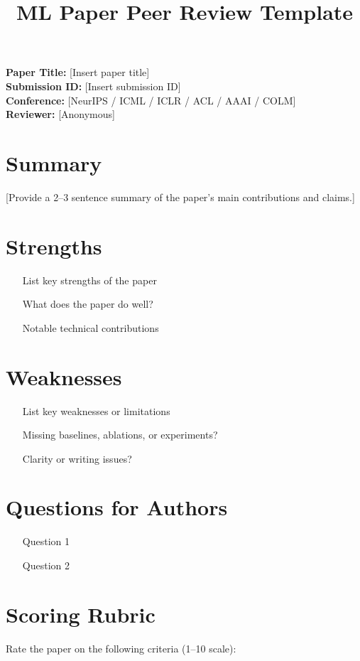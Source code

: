 \documentclass{article}
\title{ML Paper Peer Review Template}
\date{}
\begin{document}
\maketitle

\noindent\textbf{Paper Title:} [Insert paper title]\\
\textbf{Submission ID:} [Insert submission ID]\\
\textbf{Conference:} [NeurIPS / ICML / ICLR / ACL / AAAI / COLM]\\
\textbf{Reviewer:} [Anonymous]

\section{Summary}
[Provide a 2--3 sentence summary of the paper's main contributions and claims.]

\section{Strengths}
\begin{itemize}
  \item [List key strengths of the paper]
  \item [What does the paper do well?]
  \item [Notable technical contributions]
\end{itemize}

\section{Weaknesses}
\begin{itemize}
  \item [List key weaknesses or limitations]
  \item [Missing baselines, ablations, or experiments?]
  \item [Clarity or writing issues?]
\end{itemize}

\section{Questions for Authors}
\begin{enumerate}
  \item [Question 1]
  \item [Question 2]
\end{enumerate}

\section{Scoring Rubric}
Rate the paper on the following criteria (1--10 scale):
\end{document}
